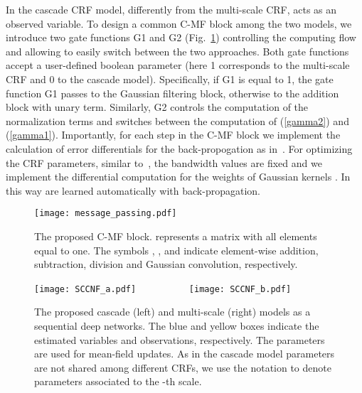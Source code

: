\documentclass[10pt,twocolumn,letterpaper]{article}
\begin{document}
In the cascade CRF model, differently from the multi-scale CRF,  acts as an observed variable. To design a common C-MF block among the two models, we introduce two gate functions G1 and G2 (Fig.~\ref{fig:HCRF-MF}) controlling the computing flow and allowing to easily switch between the two approaches. Both gate functions accept a user-defined boolean parameter (here 1 corresponds to the multi-scale CRF and 0 to the cascade model). Specifically, if G1 is equal to 1, the gate function 
G1 passes  to the Gaussian filtering block, otherwise to the addition block with unary term. 
Similarly, G2 controls the computation of the normalization terms and switches between the computation of (\ref{gamma2}) 
and (\ref{gamma1}). Importantly, for each step in the C-MF block we implement the calculation of error differentials for 
the back-propogation as in~\cite{zheng2015conditional}. For optimizing the CRF parameters, similar to~\cite{zheng2015conditional}, the 
bandwidth values  are fixed and we implement the differential computation for the weights of Gaussian kernels .
In this way  are learned automatically with back-propagation.
\vspace{-0.5cm}



\begin{figure}[!t]
\centering
\texttt{[image: message\_passing.pdf]} 
\caption{The proposed C-MF block.  represents a  matrix with all elements equal to one. 
The symbols , ,  and  indicate element-wise addition, subtraction, division and Gaussian convolution, respectively.}
\label{fig:HCRF-MF}
\vspace{-0.3cm}
\end{figure}


\begin{figure*}[!t]
\centering
\texttt{[image: SCCNF\_a.pdf]} \ \ \ \ \ \ \ \ \ \ 
\texttt{[image: SCCNF\_b.pdf]} 
\caption{The proposed cascade (left) and multi-scale (right) models as a sequential deep networks. The blue and yellow boxes indicate the
estimated variables and observations, respectively. The parameters  are used for mean-field updates. 
As in the cascade model parameters are not shared among different CRFs, we use the notation 
 to denote parameters associated to the -th scale.
}
\label{sccnf}
\vspace{-0.5cm}
\end{figure*}
\end{document}
